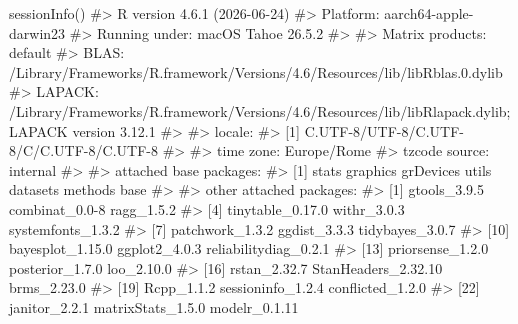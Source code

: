 \documentclass[
  italian,
  letterpaper,
  a4paper,
  11pt,
  open=any]{scrbook}
\newenvironment{Shaded}{\begin{snugshade}}{\end{snugshade}}
\newcommand{\CommentTok}[1]{\textcolor[rgb]{0.37,0.37,0.37}{#1}}
\newcommand{\FunctionTok}[1]{\textcolor[rgb]{0.28,0.35,0.67}{#1}}
\newcommand{\NormalTok}[1]{\textcolor[rgb]{0.00,0.23,0.31}{#1}}
\theoremstyle{plain}
\theoremstyle{definition}
\theoremstyle{definition}
\theoremstyle{remark}
\begin{document}
\begin{tcolorbox}[enhanced jigsaw, arc=.35mm, bottomrule=.15mm, bottomtitle=1mm, breakable, colback=white, colbacktitle=quarto-callout-note-color!10!white, colframe=quarto-callout-note-color-frame, coltitle=black, left=2mm, leftrule=.75mm, opacityback=0, opacitybacktitle=0.6, rightrule=.15mm, title=\textcolor{quarto-callout-note-color}{\faInfo}\hspace{0.5em}{Informazioni sull'ambiente di sviluppo}, titlerule=0mm, toprule=.15mm, toptitle=1mm]

\begin{Shaded}
\begin{Highlighting}[]
\FunctionTok{sessionInfo}\NormalTok{()}
\CommentTok{\#\textgreater{} R version 4.6.1 (2026{-}06{-}24)}
\CommentTok{\#\textgreater{} Platform: aarch64{-}apple{-}darwin23}
\CommentTok{\#\textgreater{} Running under: macOS Tahoe 26.5.2}
\CommentTok{\#\textgreater{} }
\CommentTok{\#\textgreater{} Matrix products: default}
\CommentTok{\#\textgreater{} BLAS:   /Library/Frameworks/R.framework/Versions/4.6/Resources/lib/libRblas.0.dylib }
\CommentTok{\#\textgreater{} LAPACK: /Library/Frameworks/R.framework/Versions/4.6/Resources/lib/libRlapack.dylib;  LAPACK version 3.12.1}
\CommentTok{\#\textgreater{} }
\CommentTok{\#\textgreater{} locale:}
\CommentTok{\#\textgreater{} [1] C.UTF{-}8/UTF{-}8/C.UTF{-}8/C/C.UTF{-}8/C.UTF{-}8}
\CommentTok{\#\textgreater{} }
\CommentTok{\#\textgreater{} time zone: Europe/Rome}
\CommentTok{\#\textgreater{} tzcode source: internal}
\CommentTok{\#\textgreater{} }
\CommentTok{\#\textgreater{} attached base packages:}
\CommentTok{\#\textgreater{} [1] stats     graphics  grDevices utils     datasets  methods   base     }
\CommentTok{\#\textgreater{} }
\CommentTok{\#\textgreater{} other attached packages:}
\CommentTok{\#\textgreater{}  [1] gtools\_3.9.5          combinat\_0.0{-}8        ragg\_1.5.2           }
\CommentTok{\#\textgreater{}  [4] tinytable\_0.17.0      withr\_3.0.3           systemfonts\_1.3.2    }
\CommentTok{\#\textgreater{}  [7] patchwork\_1.3.2       ggdist\_3.3.3          tidybayes\_3.0.7      }
\CommentTok{\#\textgreater{} [10] bayesplot\_1.15.0      ggplot2\_4.0.3         reliabilitydiag\_0.2.1}
\CommentTok{\#\textgreater{} [13] priorsense\_1.2.0      posterior\_1.7.0       loo\_2.10.0           }
\CommentTok{\#\textgreater{} [16] rstan\_2.32.7          StanHeaders\_2.32.10   brms\_2.23.0          }
\CommentTok{\#\textgreater{} [19] Rcpp\_1.1.2            sessioninfo\_1.2.4     conflicted\_1.2.0     }
\CommentTok{\#\textgreater{} [22] janitor\_2.2.1         matrixStats\_1.5.0     modelr\_0.1.11        }

\end{Highlighting}
\end{Shaded}
\end{tcolorbox}
\end{document}
